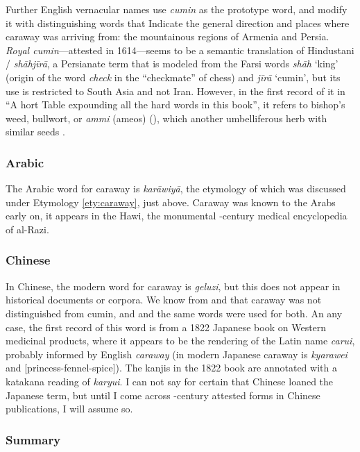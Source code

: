Further English vernacular names use \textit{cumin} as the prototype word, and modify it with distinguishing words that Indicate the general direction and places where caraway was arriving from: the mountainous regions of Armenia and Persia. \textit{Royal cumin}---attested in 1614---seems to be a semantic translation of Hindustani / \textit{shāhjīrā}, a Persianate term that is modeled from the Farsi words \textit{shāh}
`king' (origin of the word \textit{check} in the ``checkmate'' of chess) and \textit{jīrā} `cumin', but its use is restricted to South Asia and not Iran. However, in the first record of it in ``A \lgS hort Table expounding all the hard words in this book'', it refers to bishop's weed, bullwort, or \textit{ammi} (ameos) (), which another umbelliferous herb with similar seeds \autocite[]{markham_cheap_1614}.


\subsubsection{Arabic}



The Arabic word for caraway is  \textit{karāwiyā}, the etymology of which was discussed under Etymology \ref{ety:caraway}, just above. Caraway was known to the Arabs early on, it appears in the \gls{Hawi}, the monumental -century medical encyclopedia of al-Razi.

% 

\subsubsection{Chinese}



In Chinese, the modern word for caraway is  \textit{geluzi}, but this does not appear in historical documents or corpora. We know from \textcite{laufer_sino-iranica_1919} and \textcite{schafer_golden_1985} that caraway was not distinguished from cumin, and and the same words were used for both. An any case, the first record of this word is from a 1822 Japanese book on Western medicinal products, where it appears to be the rendering of the Latin name \textit{carui}, probably informed by English \textit{caraway} (in modern Japanese caraway is  \textit{kyarawei} and  [princess-fennel-spice]). The kanjis in the 1822 book are annotated with a katakana reading of  \textit{karyui}. I can not say for certain that Chinese loaned the Japanese term, but until I come across -century attested forms in Chinese publications, I will assume so.



\subsubsection{Summary}



